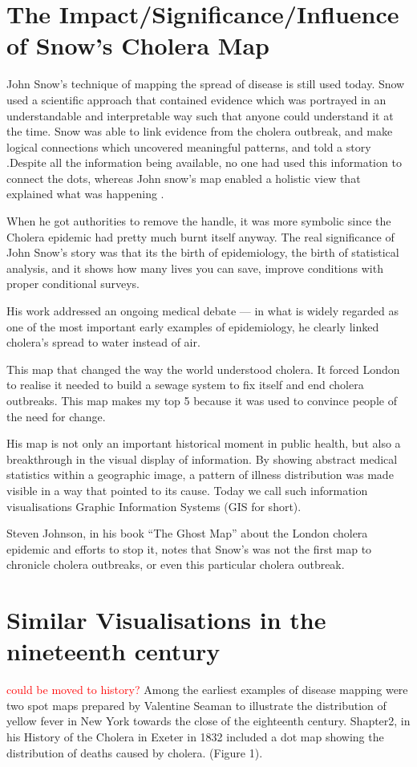 \documentclass[12pt]{article}
\newcommand\todo[1]{\textcolor{red}{#1}}
\begin{document}
\section{The Impact/Significance/Influence of Snow's Cholera Map}

John Snow's technique of mapping the spread of disease is still used today. Snow used a scientific approach that contained evidence which was portrayed in an understandable and interpretable way such that anyone could understand it at the time. Snow was able to link evidence from the cholera outbreak, and make logical connections which uncovered meaningful patterns, and told a story \cite{channel1}.Despite all the information being available, no one had used this information to connect the dots, whereas John snow's map enabled a holistic view that explained what was happening \cite{channel1}. 

When he got authorities to remove the handle, it was more symbolic since the Cholera epidemic had pretty much burnt itself anyway. The real significance of John Snow's story was that its the birth of epidemiology, the birth of statistical analysis, and it shows how many lives you can save, improve conditions with proper conditional surveys. \cite{youtube}

His work addressed an ongoing medical debate — in what is widely regarded as one of the most important early examples of epidemiology, he clearly linked cholera’s spread to water instead of air. \cite{blog}

This map that changed the way the world understood cholera. It forced London to realise it needed to build a sewage system to fix itself and end cholera outbreaks. This map makes my top 5 because it was used to convince people of the need for change. \cite{top5}

His map is not only an important historical moment in public health, but also a breakthrough in the visual display of information. By showing abstract medical statistics within a geographic image, a pattern of illness distribution was made visible in a way that pointed to its cause. Today we call such information visualisations Graphic Information Systems (GIS for short). \cite{test}

Steven Johnson, in his book “The Ghost Map” about the London cholera epidemic and efforts to stop it, notes that Snow’s was not the first map to chronicle cholera outbreaks, or even this particular cholera outbreak. \cite{history}

\section{Similar Visualisations in the nineteenth century}
\todo{could be moved to history?}
Among the earliest examples of disease mapping were
two spot maps prepared by Valentine Seaman to illustrate
the distribution of yellow fever in New York
towards the close of the eighteenth century. Shapter2, in
his History of the Cholera in Exeter in 1832 included a dot
map showing the distribution of deaths caused by
cholera. (Figure 1). \cite{howe1970some}
\end{document}
